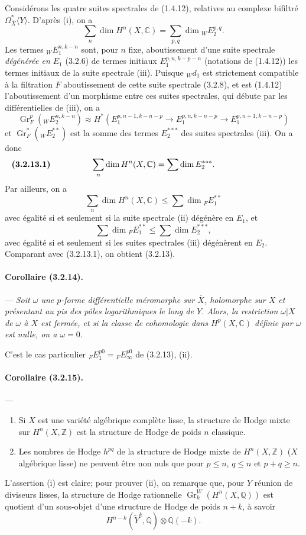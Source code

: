 \documentclass[10pt]{article}
\newcommand{\C}{\mathbb C}
\newcommand{\Q}{\mathbb Q}
\newcommand{\Z}{\mathbb Z}
\newcommand{\Gr}{\operatorname{Gr}}
\begin{document}
Considérons les quatre suites spectrales de (1.4.12), relatives au complexe bifiltré $\Omega_{\overline X}^{*}\langle Y\rangle$. D'après (i), on a
\[
\sum_n\dim H^n(X,\C)=\sum_{p,q}\dim {}_WE_2^{p,q}.
\]
Les termes ${}_WE_1^{n,k-n}$ sont, pour $n$ fixe, aboutissement d'une suite spectrale \emph{dégénérée en $E_1$} (3.2.6) de termes initiaux $E_1^{p,n,k-p-n}$ (notations de (1.4.12)) les termes initiaux de la suite spectrale (iii). Puisque ${}_Wd_1$ est strictement compatible à la filtration $F$ aboutissement
de cette suite spectrale (3.2.8), et est (1.4.12) l'aboutissement d'un morphisme entre ces suites spectrales, qui débute par les différentielles de (iii), on a
\[
\Gr_F^p({}_WE_2^{n,k-n})\approx
H^*(E_1^{p,n-1,k-n-p}\to E_1^{p,n,k-n-p}\to E_1^{p,n+1,k-n-p})
\]
et $\Gr_F^*({}_WE_2^{**})$ est la somme des termes $E_2^{***}$ des suites spectrales (iii). On a donc
\[
\makebox[\textwidth][s]{\textbf{(3.2.13.1)}\hfill$\displaystyle \sum_n \dim H^n(X,\C)=\sum\dim E_2^{***}.$\hfill\phantom{\textbf{(3.2.13.1)}}}
\]
Par ailleurs, on a
\[
\sum_n \dim H^n(X,\C)\le \sum \dim {}_F E_1^{**}
\]
avec égalité si et seulement si la suite spectrale (ii) dégénère en $E_1$, et
\[
\sum\dim {}_F E_1^{**}\le \sum\dim E_2^{***},
\]
avec égalité si et seulement si les suites spectrales (iii) dégénèrent en $E_2$. Comparant avec (3.2.13.1), on obtient (3.2.13).

\paragraph{Corollaire (3.2.14).} --- {\itshape Soit $\omega$ une $p$-forme différentielle méromorphe sur $\overline X$, holomorphe sur $X$ et présentant au pis des pôles logarithmiques le long de $Y$. Alors, la restriction $\omega|X$ de $\omega$ à $X$ est fermée, et si la classe de cohomologie dans $H^p(X,\C)$ définie par $\omega$ est nulle, on a $\omega=0$.}

C'est le cas particulier ${}_FE_1^{p0}={}_FE_\infty^{p0}$ de (3.2.13), (ii).

\paragraph{Corollaire (3.2.15).} --- {\itshape
\begin{enumerate}[label=(\roman*),font=\itshape]
\item Si $X$ est une variété algébrique complète lisse, la structure de Hodge mixte sur $H^n(X,\Z)$ est la structure de Hodge de poids $n$ classique.
\item Les nombres de Hodge $h^{pq}$ de la structure de Hodge mixte de $H^n(X,\Z)$ ($X$ algébrique lisse) ne peuvent être non nuls que pour $p\le n$, $q\le n$ et $p+q\ge n$.
\end{enumerate}}
L'assertion (i) est claire; pour prouver (ii), on remarque que, pour $Y$ réunion de diviseurs lisses, la structure de Hodge rationnelle $\Gr_k^W(H^n(X,\Q))$ est quotient d'un sous-objet d'une structure de Hodge de poids $n+k$, à savoir
\[
H^{n-k}(\widetilde Y^k,\Q)\otimes\Q(-k).
\]
\end{document}
